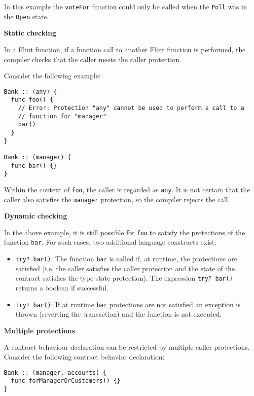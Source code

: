 In this example the \texttt{voteFor} function could only be called when the \texttt{Poll} was in the \texttt{Open} state.

\textbf{Static checking}
\label{sec:appendix-b-static-checking}

In a Flint function, if a function call to another Flint function is performed, the compiler checks that the caller meets the caller protection.

Consider the following example:

\begin{verbatim}
Bank :: (any) {
  func foo() {
    // Error: Protection "any" cannot be used to perform a call to a
    // function for "manager"
    bar()
  }
}

Bank :: (manager) {
  func bar() {}
}
\end{verbatim}

Within the context of \texttt{foo}, the caller is regarded as \texttt{any}. It is not certain that the caller also satisfies the \texttt{manager} protection, so the compiler rejects the call.

\textbf{Dynamic checking}
\label{sec:appendix-b-dynamic-checking}

In the above example, it is still possible for \texttt{foo} to satisfy the protections of the function \texttt{bar}. For such cases, two additional language constructs exist:

\begin{itemize}
	\item \texttt{try? bar()}: The function \texttt{bar} is called if, at runtime, the protections are satisfied (i.e. the caller satisfies the caller protection and the state of the contract satisfies the type state protection). The expression \texttt{try? bar()} returns a boolean if successful.
	\item \texttt{try! bar()}: If at runtime \texttt{bar} protections are not satisfied an exception is thrown (reverting the transaction) and the function is not executed.
\end{itemize}

\textbf{Multiple protections}
\label{sec:appendix-b-multiple-protections}

A contract behaviour declaration can be restricted by multiple caller protections. Consider the following contract behavior declaration:

\begin{verbatim}
Bank :: (manager, accounts) {
  func forManagerOrCustomers() {}
}
\end{verbatim}

